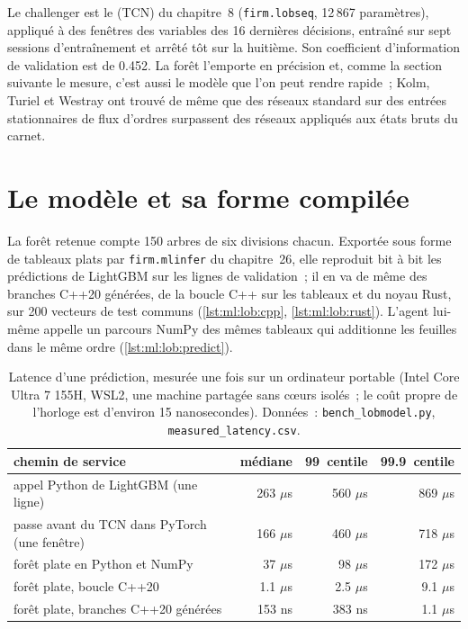 Le challenger est le  (TCN) du chapitre~8 (\texttt{firm.lobseq}, 12\,867 paramètres), appliqué à des fenêtres des variables des 16 dernières
décisions, entraîné sur sept sessions d'entraînement et arrêté tôt sur la huitième. Son coefficient d'information de validation est de
0.452. La forêt l'emporte en précision et, comme la section suivante le mesure, c'est aussi le modèle que l'on peut rendre rapide~; Kolm, Turiel et
Westray ont trouvé de même que des réseaux standard sur des entrées stationnaires de flux d'ordres surpassent des réseaux appliqués aux états bruts du carnet.

\section{Le modèle et sa forme compilée}

La forêt retenue compte 150 arbres de six divisions chacun. Exportée sous forme de tableaux plats par \texttt{firm.mlinfer} du chapitre~26, elle reproduit
bit à bit les prédictions de LightGBM sur les lignes de validation~; il en va de même des branches C++20 générées, de la boucle C++ sur les tableaux et du
noyau Rust, sur 200 vecteurs de test communs (\cref{lst:ml:lob:cpp}, \cref{lst:ml:lob:rust}). L'agent lui-même appelle un parcours NumPy des
mêmes tableaux qui additionne les feuilles dans le même ordre (\cref{lst:ml:lob:predict}).

\begin{table}[htbp]
\centering\small
\begin{tabular}{@{}lrrr@{}}
\toprule
chemin de service & médiane & 99\up{e}~centile & 99.9\up{e}~centile\\
\midrule
appel Python de LightGBM (une ligne) & 263 $\mu$s & 560 $\mu$s & 869 $\mu$s\\
passe avant du TCN dans PyTorch (une fenêtre) & 166 $\mu$s & 460 $\mu$s & 718 $\mu$s\\
forêt plate en Python et NumPy & 37 $\mu$s & 98 $\mu$s & 172 $\mu$s\\
forêt plate, boucle C++20 & 1.1 $\mu$s & 2.5 $\mu$s & 9.1 $\mu$s\\
forêt plate, branches C++20 générées & 153 ns & 383 ns & 1.1 $\mu$s\\
\bottomrule
\end{tabular}
\caption{Latence d'une prédiction, mesurée une fois sur un ordinateur portable (Intel Core Ultra 7 155H, WSL2, une machine partagée sans
cœurs isolés~; le coût propre de l'horloge est d'environ 15 nanosecondes). Données~: \texttt{bench\_lobmodel.py},
\texttt{measured\_latency.csv}.}\label{tab:ml:lob:latency}
\end{table}


